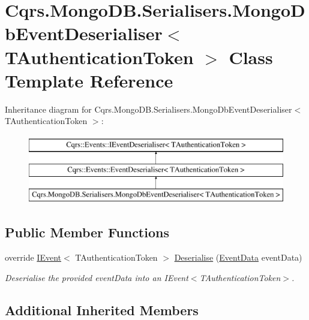 \hypertarget{classCqrs_1_1MongoDB_1_1Serialisers_1_1MongoDbEventDeserialiser}{}\section{Cqrs.\+Mongo\+D\+B.\+Serialisers.\+Mongo\+Db\+Event\+Deserialiser$<$ T\+Authentication\+Token $>$ Class Template Reference}
\label{classCqrs_1_1MongoDB_1_1Serialisers_1_1MongoDbEventDeserialiser}
Inheritance diagram for Cqrs.\+Mongo\+D\+B.\+Serialisers.\+Mongo\+Db\+Event\+Deserialiser$<$ T\+Authentication\+Token $>$\+:\begin{figure}[H]
\begin{center}
\leavevmode
\includegraphics[height=3.000000cm]{classCqrs_1_1MongoDB_1_1Serialisers_1_1MongoDbEventDeserialiser}
\end{center}
\end{figure}
\subsection*{Public Member Functions}
\begin{DoxyCompactItemize}
\item 
override \hyperlink{interfaceCqrs_1_1Events_1_1IEvent}{I\+Event}$<$ T\+Authentication\+Token $>$ \hyperlink{classCqrs_1_1MongoDB_1_1Serialisers_1_1MongoDbEventDeserialiser_a2ea63367d97bf66e3dffcabb8c53005e_a2ea63367d97bf66e3dffcabb8c53005e}{Deserialise} (\hyperlink{classCqrs_1_1Events_1_1EventData}{Event\+Data} event\+Data)
\begin{DoxyCompactList}\small\item\em Deserialise the provided {\itshape event\+Data}  into an I\+Event$<$\+T\+Authentication\+Token$>$. \end{DoxyCompactList}\end{DoxyCompactItemize}
\subsection*{Additional Inherited Members}


